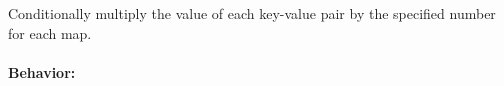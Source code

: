 Conditionally multiply the value of each key-value pair by the specified number
for each map.

\paragraph{Behavior:}
\begin{itemize}[noitemsep]



\end{itemize}

